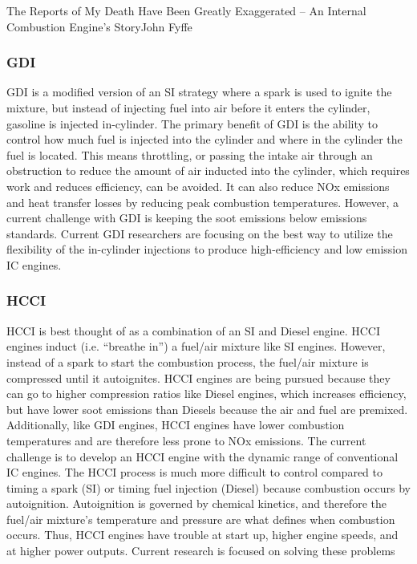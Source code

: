 \documentclass{papertex}
\begin{document}
\begin{news}{2}{The Reports of My Death Have Been Greatly Exaggerated -- An Internal Combustion Engine’s Story}{John Fyffe}{}{}
\subsubsection*{GDI}

GDI is a modified version of an SI strategy where a spark is used to ignite 
the mixture, but instead of injecting fuel into air before it enters the 
cylinder, gasoline is injected in-cylinder.  The primary benefit of GDI is 
the ability to control how much fuel is injected into the cylinder and where 
in the cylinder the fuel is located.  This means throttling, or passing the 
intake air through an obstruction to reduce the amount of air inducted into 
the cylinder, which requires work and reduces efficiency, can be avoided. 
It can also reduce NOx emissions and heat transfer losses by reducing peak 
combustion temperatures.  However, a current challenge with GDI is keeping 
the soot emissions below emissions standards.   Current GDI researchers are 
focusing on the best way to utilize the flexibility of the in-cylinder 
injections to produce high-efficiency and low emission IC engines.

\subsubsection*{HCCI}

HCCI is best thought of as a combination of an SI and Diesel engine.  HCCI 
engines induct (i.e. “breathe in”) a fuel/air mixture like SI engines.  
However, instead of a spark to start the combustion process, the fuel/air 
mixture is compressed until it autoignites.  HCCI engines are being pursued 
because they can go to higher compression ratios like Diesel engines, which 
increases efficiency, but have lower soot emissions than Diesels because 
the air and fuel are premixed.  Additionally, like GDI engines, HCCI engines 
have lower combustion temperatures and are therefore less prone to NOx 
emissions.  The current challenge is to develop an HCCI engine with the 
dynamic range of conventional IC engines.  The HCCI process is much more 
difficult to control compared to timing a spark (SI) or timing fuel injection 
(Diesel) because combustion occurs by autoignition.  Autoignition is governed 
by chemical kinetics, and therefore the fuel/air mixture’s temperature and 
pressure are what defines when combustion occurs.   Thus, HCCI engines have 
trouble at start up, higher engine speeds, and at higher power outputs. 
Current research is focused on solving these problems


\end{news}
\end{document}
